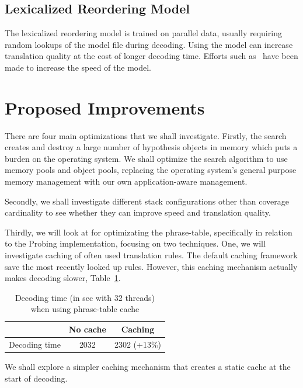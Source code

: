 \documentclass[11pt]{article}
\begin{document}
\subsection{Lexicalized Reordering Model}

The lexicalized reordering model is trained on parallel data, usually requiring random lookups of the model file during decoding. Using the model can increase translation quality at the cost of longer decoding time. Efforts such as~ have been made to increase the speed of the model.

\section{Proposed Improvements}

There are four main optimizations that we shall investigate. Firstly, the search creates and destroy a large number of hypothesis objects in memory which puts a burden on the operating system. We shall optimize the search algorithm to use memory pools and object pools, replacing the operating system's general purpose memory management with our own application-aware management. 



Secondly, we shall investigate different stack configurations other than coverage cardinality to see whether they can improve speed and translation quality.

Thirdly, we will look at for optimizating the phrase-table, specifically in relation to the Probing implementation, focusing on two techniques. One, we will investigate caching of often used translation rules. The default caching framework save the most recently looked up rules. However, this caching mechanism actually makes decoding slower, Table~\ref{tab:phrase-table-cache}. 
\begin{table}[h]
\small
\begin{center}
\begin{tabular}{|l|c|c|} \hline
		& No cache	& Caching \\ \hline
Decoding time  	& 2032 		& 2302 (+13\%) \\ \hline
\end{tabular}
\end{center}
\caption{Decoding time (in sec with 32 threads) when using phrase-table cache}
\label{tab:phrase-table-cache}
\end{table}
We shall explore a simpler caching mechanism that creates a static cache at the start of decoding.
\end{document}
